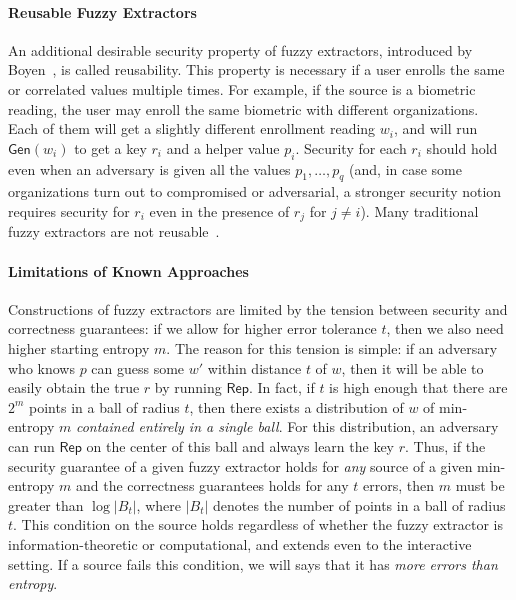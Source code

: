 \documentclass[11pt]{article}
\newcommand{\class}[1]{{\ensuremath{\mathsf{#1}}}}
\newcommand{\gen}{\ensuremath{\class{Gen}}\xspace}
\newcommand{\rep}{\ensuremath{\class{Rep}}\xspace}
\begin{document}
\paragraph{Reusable Fuzzy Extractors}
An additional desirable security property of fuzzy extractors, introduced by Boyen~\cite{Boyen2004}, is called reusability. This property is necessary if a user enrolls the same or correlated values multiple times. For example, if the source is a biometric reading, the user may enroll the same biometric with different organizations.  Each of them will get a slightly different enrollment reading $w_i$, and will run $\gen(w_i)$ to get a key $r_i$ and a helper value $p_i$. Security for each $r_i$ should hold even when an adversary is given all the values $p_1, \dots, p_q$ (and, in case some organizations turn out to compromised or adversarial, a stronger security notion requires security for $r_i$ even in the presence of $r_j$ for $j\neq i$).  Many traditional fuzzy extractors are not reusable~\cite{Boyen2004,simoens2009privacy,blanton2012non,blanton2013analysis}.


\paragraph{Limitations of Known Approaches}

Constructions of fuzzy extractors are limited by the tension between security and correctness guarantees: if we allow for higher error tolerance $t$, then we also need higher starting entropy $m$. The reason for this tension is simple: if an adversary who knows $p$ can guess some $w'$ within distance $t$ of $w$, then it will be able to easily obtain the true $r$ by running $\rep$.
In fact, if $t$ is high enough that there are $2^m$ points in a ball of radius $t$, then there exists a distribution of $w$ of min-entropy $m$  \emph{contained entirely in a single ball}.  For this distribution, an adversary can run $\rep$ on the center of this ball and always learn the key $r$.
Thus, if the security guarantee of a given fuzzy extractor holds for \emph{any} source of a given min-entropy $m$ and the correctness guarantees holds for any $t$ errors, then $m$ must   be greater than $\log |B_t|$, where $|B_t|$ denotes the number of points in a ball of radius $t$.  This condition on the source holds regardless of whether the fuzzy extractor is information-theoretic or computational, and extends even to the interactive setting.
If a source fails this condition, we will says that it has \emph{more errors than entropy}.
\end{document}
